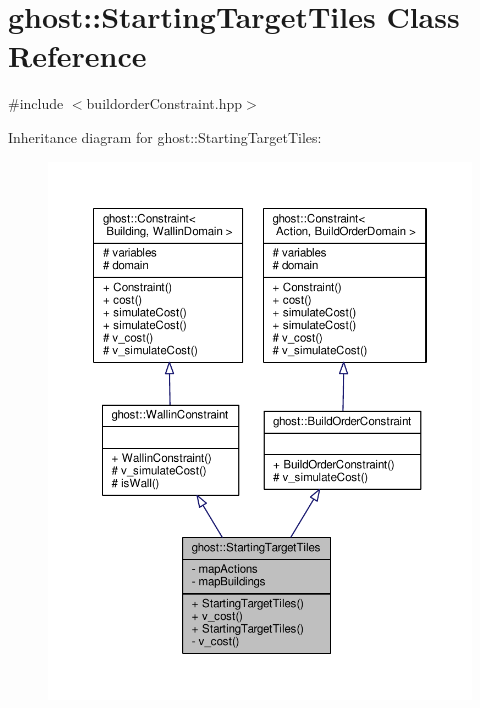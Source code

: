 \hypertarget{classghost_1_1StartingTargetTiles}{\section{ghost\-:\-:Starting\-Target\-Tiles Class Reference}
\label{classghost_1_1StartingTargetTiles}
}


{\ttfamily \#include $<$buildorder\-Constraint.\-hpp$>$}



Inheritance diagram for ghost\-:\-:Starting\-Target\-Tiles\-:
\nopagebreak
\begin{figure}[H]
\begin{center}
\leavevmode
\includegraphics[width=350pt]{classghost_1_1StartingTargetTiles__inherit__graph}
\end{center}
\end{figure}


